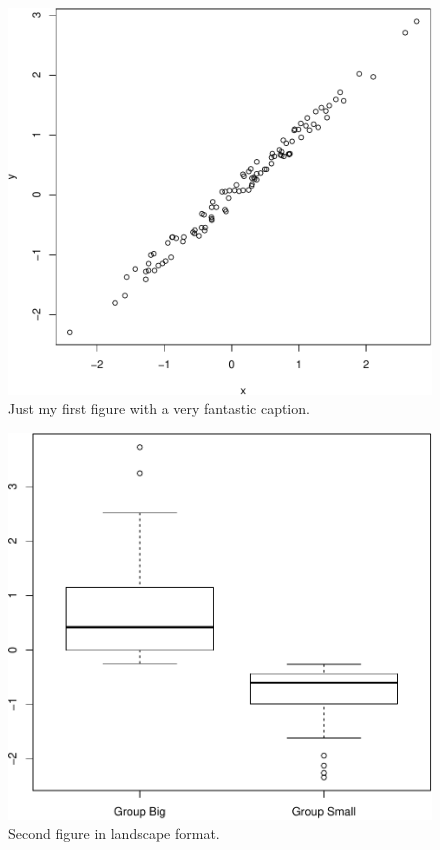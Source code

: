 \documentclass[11pt,a4paper]{article}
\newcommand{\blandscape}{\begin{landscape}}
\newcommand{\elandscape}{\end{landscape}}
\begin{document}
\clearpage

\listoffigures

\newpage

\begin{figure}
\centering
\includegraphics{output/figures/Fig1-1.pdf}
\caption{Just my first figure with a very fantastic caption.}
\end{figure}

\newpage

\blandscape

\begin{figure}
\centering
\includegraphics{output/figures/Fig2-1.pdf}
\caption{Second figure in landscape format.}
\end{figure}

\elandscape

\clearpage
\end{document}
